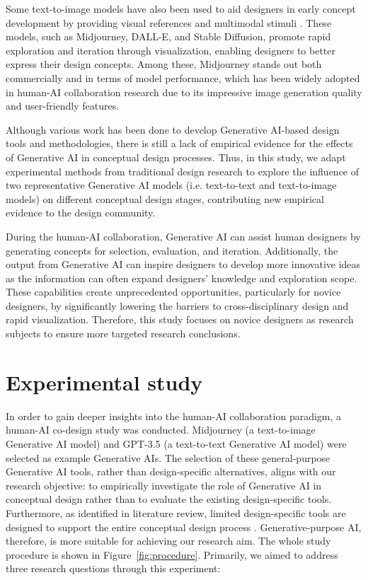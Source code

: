 \documentclass{dsj}
\begin{document}
Some text-to-image models have also been used to aid designers in early concept development by providing visual references and multimodal stimuli \citep{kwon2023understanding}. These models, such as Midjourney, DALL-E, and Stable Diffusion, promote rapid exploration and iteration through visualization, enabling designers to better express their design concepts. Among these, Midjourney stands out both commercially and in terms of model performance, which has been widely adopted in human-AI collaboration research \citep{tan2024using, wadinambiarachchi2024effects, mahdavi2024ai} due to its impressive image generation quality and user-friendly features.

Although various work has been done to develop Generative AI-based design tools and methodologies, there is still a lack of empirical evidence for the effects of Generative AI in conceptual design processes. Thus, in this study, we adapt experimental methods from traditional design research to explore the influence of two representative Generative AI models (i.e. text-to-text and text-to-image models) on different conceptual design stages, contributing new empirical evidence to the design community. 

During the human-AI collaboration, Generative AI can assist human designers by generating concepts for selection, evaluation, and iteration. Additionally, the output from Generative AI can inspire designers to develop more innovative ideas as the information can often expand designers’ knowledge and exploration scope. These capabilities create unprecedented opportunities, particularly for novice designers, by significantly lowering the barriers to cross-disciplinary design and rapid visualization. Therefore, this study focuses on novice designers as research subjects to ensure more targeted research conclusions. 

\section{Experimental study}
In order to gain deeper insights into the human-AI collaboration paradigm, a human-AI co-design study was conducted. Midjourney (a text-to-image Generative AI model) and GPT-3.5 (a text-to-text Generative AI model) were selected as example Generative AIs. The selection of these general-purpose Generative AI tools, rather than design-specific alternatives, aligns with our research objective: to empirically investigate the role of Generative AI in conceptual design rather than to evaluate the existing design-specific tools. Furthermore, as identified in literature review, limited design-specific tools are designed to support the entire conceptual design process \citep{lee2024and}. Generative-purpose AI, therefore, is more suitable for achieving our research aim. The whole study procedure is shown in Figure~\ref{fig:procedure}. Primarily, we aimed to address three research questions through this experiment:
\end{document}
